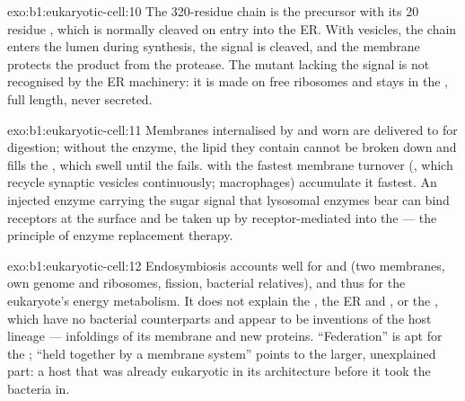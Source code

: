 \begin{solution}{exo:b1:eukaryotic-cell:10}
The \qty{320}{}-residue chain is the precursor with its \qty{20}{}
residue , which is normally cleaved on entry into the ER.
With vesicles, the chain enters the lumen during synthesis, the signal
is cleaved, and the membrane protects the product from the protease.
The mutant lacking the signal is not recognised by the ER machinery: it
is made on free ribosomes and stays in the , full length, never
secreted.
\end{solution}

\begin{solution}{exo:b1:eukaryotic-cell:11}
Membranes internalised by  and worn  are delivered
to  for digestion; without the enzyme, the lipid they contain
cannot be broken down and fills the , which swell until the
 fails.  with the fastest membrane turnover (, which
recycle synaptic vesicles continuously; macrophages) accumulate it
fastest. An injected enzyme carrying the sugar signal that lysosomal
enzymes bear can bind receptors at the  surface and be taken up by
receptor-mediated  into the  --- the principle of
enzyme replacement therapy.
\end{solution}

\begin{solution}{exo:b1:eukaryotic-cell:12}
Endosymbiosis accounts well for  and  (two
membranes, own genome and ribosomes, fission, bacterial relatives), and
thus for the eukaryote's energy metabolism. It does not explain the
, the ER and , or the , which have no bacterial
counterparts and appear to be inventions of the host lineage ---
infoldings of its membrane and new proteins. ``Federation'' is apt for
the ; ``held together by a membrane system'' points to the
larger, unexplained part: a host  that was already eukaryotic in
its architecture before it took the bacteria in.
\end{solution}


